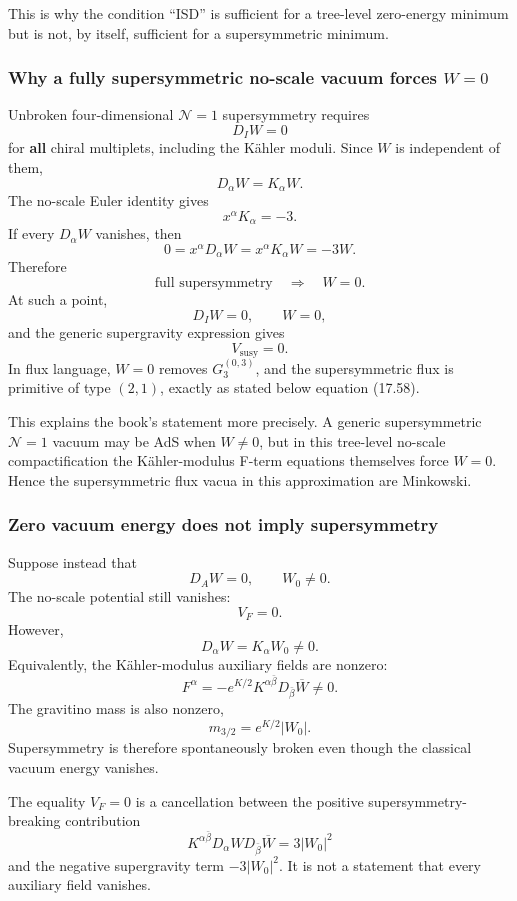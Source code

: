 \documentclass[
  10pt,
  a4paper,
  openany]{book}
\begin{document}
This is why the condition ``ISD'' is sufficient for a tree-level
zero-energy minimum but is not, by itself, sufficient for a
supersymmetric minimum.

\subsubsection{\texorpdfstring{Why a fully supersymmetric no-scale
vacuum forces
\(W=0\)}{Why a fully supersymmetric no-scale vacuum forces W=0}}\label{why-a-fully-supersymmetric-no-scale-vacuum-forces-w0}

Unbroken four-dimensional \(\mathcal N=1\) supersymmetry requires \[
D_IW=0
\] for \textbf{all} chiral multiplets, including the Kähler moduli.
Since \(W\) is independent of them, \[
D_\alpha W=K_\alpha W.
\] The no-scale Euler identity gives \[
x^\alpha K_\alpha=-3.
\] If every \(D_\alpha W\) vanishes, then \[
0
=x^\alpha D_\alpha W
=x^\alpha K_\alpha W
=-3W.
\] Therefore \[
\boxed{
\text{full supersymmetry}\quad\Longrightarrow\quad W=0.
}
\] At such a point, \[
D_IW=0,
\qquad
W=0,
\] and the generic supergravity expression gives \[
\boxed{V_{\mathrm{susy}}=0.}
\] In flux language, \(W=0\) removes \(G_3^{(0,3)}\), and the
supersymmetric flux is primitive of type \((2,1)\), exactly as stated
below equation (17.58).

This explains the book's statement more precisely. A generic
supersymmetric \(\mathcal N=1\) vacuum may be AdS when \(W\neq0\), but
in this tree-level no-scale compactification the Kähler-modulus F-term
equations themselves force \(W=0\). Hence the supersymmetric flux vacua
in this approximation are Minkowski.

\subsubsection{Zero vacuum energy does not imply
supersymmetry}\label{zero-vacuum-energy-does-not-imply-supersymmetry}

Suppose instead that \[
D_AW=0,
\qquad
W_0\neq0.
\] The no-scale potential still vanishes: \[
V_F=0.
\] However, \[
D_\alpha W=K_\alpha W_0\neq0.
\] Equivalently, the Kähler-modulus auxiliary fields are nonzero: \[
F^\alpha
=-e^{K/2}K^{\alpha\bar\beta}
D_{\bar\beta}\overline W
\neq0.
\] The gravitino mass is also nonzero, \[
m_{3/2}=e^{K/2}|W_0|.
\] Supersymmetry is therefore spontaneously broken even though the
classical vacuum energy vanishes.

The equality \(V_F=0\) is a cancellation between the positive
supersymmetry-breaking contribution \[
K^{\alpha\bar\beta}D_\alpha W
D_{\bar\beta}\overline W
=3|W_0|^2
\] and the negative supergravity term \(-3|W_0|^2\). It is not a
statement that every auxiliary field vanishes.
\end{document}
